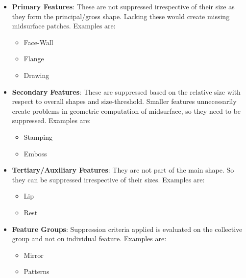 \begin{minipage}[t]{0.45\linewidth}
\begin{itemize}
[noitemsep,topsep=2pt,parsep=2pt,partopsep=2pt]
\item \textbf{Primary Features}: These are not suppressed irrespective of their size as they form the principal/gross shape. Lacking these would create missing midsurface patches. Examples are:
	\begin{itemize} [noitemsep,topsep=2pt,parsep=2pt,partopsep=2pt]
	\item Face-Wall
	\item Flange
	\item Drawing
	\end{itemize}
\item \textbf{Secondary Features}: These are suppressed based on the relative size with respect to overall shapes and size-threshold. Smaller features unnecessarily create problems in geometric computation of midsurface, so they need to be suppressed.
 Examples are:
	\begin{itemize} [noitemsep,topsep=2pt,parsep=2pt,partopsep=2pt]
	\item Stamping
	\item Emboss 
	\end{itemize}
	
\item \textbf{Tertiary/Auxiliary Features}: They are not part of the main shape. So they can be suppressed irrespective of their sizes.
Examples are:
	\begin{itemize} [noitemsep,topsep=2pt,parsep=2pt,partopsep=2pt]
	\item Lip
	\item Rest 
	\end{itemize}
	
		
\item \textbf{Feature Groups}: Suppression criteria applied is evaluated on the collective group and not on individual feature. 	Examples are:
\begin{itemize} [noitemsep,topsep=2pt,parsep=2pt,partopsep=2pt]
	\item Mirror
	\item Patterns
	\end{itemize}
\end{itemize}

\end{minipage}
